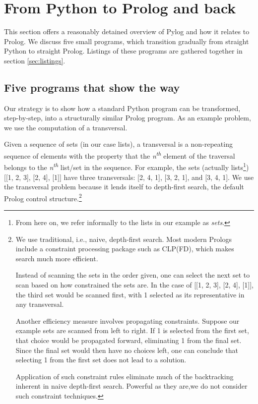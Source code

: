 
\section{From Python to Prolog and back}\label{sec:Pylog}
This section offers a reasonably detained overview of Pylog and how it relates to Prolog. We discuss five small programs, which transition gradually from straight Python to straight Prolog. Listings of these programs are gathered together in section \ref{sec:listings}.
\subsection{Five programs that show the way}
\begin{sloppypar}

Our strategy is to show how a standard Python program can be transformed, step-by-step, into a structurally similar Prolog program. As an example problem, we use the computation of a transversal. 

Given a sequence of sets (in our case lists), a transversal is a non-repeating sequence of elements with the property that the \textit{n\textsuperscript{th}} element of the traversal belongs to the \textit{n\textsuperscript{th}} list/set in the sequence. For example, the sets (actually lists\footnote{From here on, we refer informally to the lists in our example as \textit{sets}.}) [[1, 2, 3], [2, 4], [1]] have three transversals: [2, 4, 1], [3, 2, 1], and [3, 4, 1]. We use the transversal problem because it lends itself to depth-first search, the default Prolog control structure.\footnote{We use traditional, i.e., naive, depth-first search. Most modern Prologs include a constraint processing package such as CLP(FD)\cite{Triska2016}, which makes search much more efficient.

Instead of scanning the sets in the order given, one can select the next set to scan based on how constrained the sets are. In the case of [[1, 2, 3], [2, 4], [1]], the third set would be scanned first, with 1 selected as its representative in any transversal. 

Another efficiency measure involves propagating constraints. Suppose our example sets are scanned from left to right. If 1 is selected from the first set, that choice would be propagated forward, eliminating 1 from the final set. Since the final set would then have no choices left, one can conclude that selecting 1 from the first set does not lead to a solution. 

Application of such constraint rules eliminate much of the backtracking inherent in naive depth-first search. Powerful as they are,we do not consider such constraint techniques.}


\end{sloppypar}
